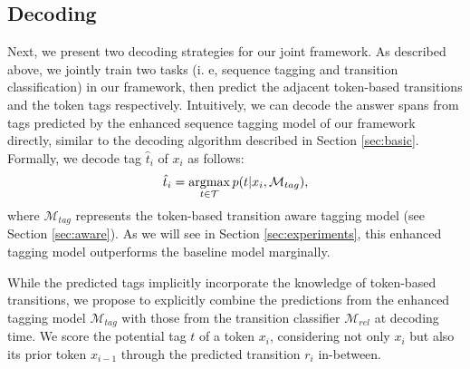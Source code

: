 \documentclass[a4paper]{cas-sc}
\newcommand{\1}[1]{\mathds{1}\left[#1\right]}
\newcommand{\secref}[1]{Section \ref{#1}}
\newcommand{\argmax}{\operatornamewithlimits{argmax}}
\begin{document}
\subsection{Decoding}
\label{sec:decoding}
Next, we present two decoding strategies for our joint framework.
As described above, we jointly train two tasks (i. e, sequence tagging and transition classification) in our framework, then predict the adjacent token-based transitions and the token tags respectively.
Intuitively,  
we can decode the answer spans from tags predicted by the enhanced sequence tagging model of our framework directly, 
similar to the decoding algorithm described in \secref{sec:basic}.
Formally, we decode tag $\hat{t}_i$ of $x_i$ as follows:
\begin{equation}\label{eq:t_i1}
	\hat{t}_i = \argmax_{t\in \mathcal{T}} p(t | x_i, \mathcal{M}_{tag}),
\end{equation}
where $\mathcal{M}_{tag}$ represents the token-based transition aware tagging model (see \secref{sec:aware}). 
As we will see in \secref{sec:experiments}, this enhanced tagging model outperforms the baseline model marginally.

While the predicted tags implicitly incorporate the knowledge of token-based transitions, we propose to explicitly combine the predictions from the enhanced tagging model $\mathcal{M}_{tag}$ with those from the transition classifier $\mathcal{M}_{rel}$ at decoding time. We score the potential tag $t$ of a token $x_i$, considering not only $x_i$ but also its prior token $x_{i-1}$ through the predicted transition $r_i$ in-between.
\end{document}
